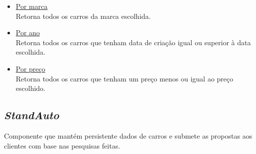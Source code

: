 \documentclass[a4paper]{article}
\begin{document}
\begin{itemize}

\item
\underline{Por marca}\\
Retorna todos os carros da marca escolhida.

\item
\underline{Por ano}\\
Retorna todos os carros que tenham data de criação igual ou superior à data escolhida.

\item
\underline{Por preço}\\
Retorna todos os carros que tenham um preço menos ou igual ao preço escolhido.
\end{itemize}


\subsection{\emph{StandAuto}}
Componente que mantém persistente dados de carros e submete as propostas aos clientes com base nas pesquisas feitas.
\end{document}
